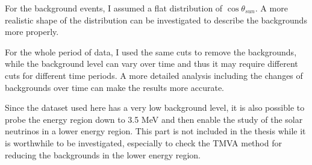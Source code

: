 For the background events, I assumed a flat distribution of $\cos\theta_{sun}$. A more realistic shape of the distribution can be investigated to describe the backgrounds more properly.

For the whole period of data, I used the same cuts to remove the backgrounds, while the background level can vary over time and thus it may require different cuts for different time periods. A more detailed analysis including the changes of backgrounds over time can make the results more accurate.

Since the dataset used here has a very low background level, it is also possible to probe the energy region down to 3.5 MeV and then enable the study of the solar neutrinos in a lower energy region. This part is not included in the thesis while it is worthwhile to be investigated, especially to check the TMVA method for reducing the backgrounds in the lower energy region.